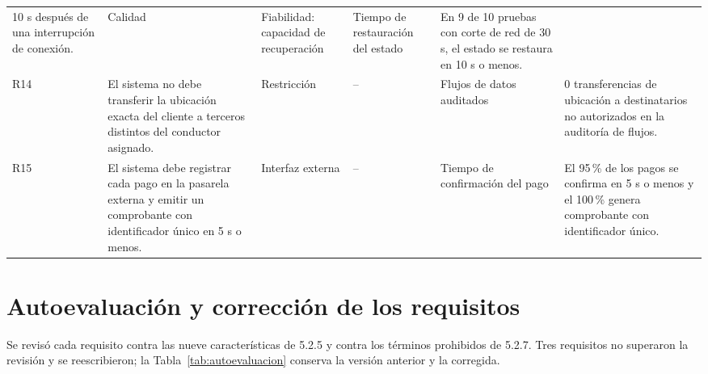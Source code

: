 \documentclass[12pt,a4paper]{article}
\begin{document}
{\begin{longtable}{@{}L{0.9cm}L{4.3cm}L{1.8cm}L{2.2cm}L{2.0cm}L{2.3cm}@{}}
10 s después de una interrupción de conexión. & Calidad & Fiabilidad:
capacidad de recuperación & Tiempo de restauración del estado & En 9 de 10
pruebas con corte de red de 30 s, el estado se restaura en 10 s o menos. \\
R14 & El sistema no debe transferir la ubicación exacta del cliente a
terceros distintos del conductor asignado. & Restricción & -- & Flujos de
datos auditados & 0 transferencias de ubicación a destinatarios no
autorizados en la auditoría de flujos. \\
R15 & El sistema debe registrar cada pago en la pasarela externa y emitir
un comprobante con identificador único en 5 s o menos. & Interfaz externa &
-- & Tiempo de confirmación del pago & El 95\,\% de los pagos se confirma
en 5 s o menos y el 100\,\% genera comprobante con identificador único. \\
\end{longtable}
}

\section{Autoevaluación y corrección de los requisitos}
\label{sec:autoevaluacion}

Se revisó cada requisito contra las nueve características de 5.2.5 y
contra los términos prohibidos de 5.2.7. Tres requisitos no superaron la
revisión y se reescribieron; la Tabla~\ref{tab:autoevaluacion} conserva la
versión anterior y la corregida.
\end{document}
